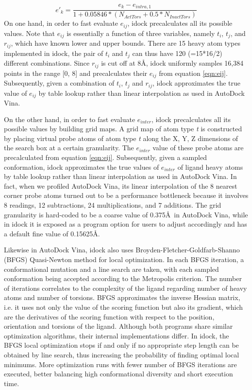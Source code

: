 \begin{equation}
\label{eqn:FlexibilityPenalty}
e'_k = \frac{e_k - e_{intra,1}}{1 + 0.05846 * (N_{ActTors} + 0.5 * N_{InactTors})}
\end{equation}
On one hand, in order to fast evaluate $e_{ij}$, idock precalculates all its possible values. Note that $e_{ij}$ is essentially a function of three variables, namely $t_i$, $t_j$, and $r_{ij}$, which have known lower and upper bounds. There are 15 heavy atom types implemented in idock, the pair of $t_i$ and $t_j$ can thus have 120 (=15*16/2) different combinations. Since $r_{ij}$ is cut off at 8\AA, idock uniformly samples 16,384 points in the range [0, 8] and precalculates their $e_{ij}$ from equation \eqref{eqn:eij}. Subsequently, given a combination of $t_i$, $t_j$ and $r_{ij}$, idock approximates the true value of $e_{ij}$ by table lookup rather than linear interpolation as used in AutoDock Vina.

On the other hand, in order to fast evaluate $e_{inter}$, idock precalculates all its possible values by building grid maps. A grid map of atom type \textit{t} is constructed by placing virtual probe atoms of atom type \textit{t} along the X, Y, Z dimensions of the search box at a certain granularity. The $e_{inter}$ value of these probe atoms are precalculated from equation \eqref{eqn:eij}. Subsequently, given a sampled conformation, idock approximates the true values of $e_{inter}$ of ligand heavy atoms by table lookup rather than linear interpolation as used in AutoDock Vina. In fact, when we profiled AutoDock Vina, its linear interpolation of the 8 nearest corner probe atoms turned out to be a performance bottleneck because it involves 8 readings, 12 subtractions, 24 multiplications, and 7 additions. The grid granularity is hard-coded to be a coarse value of 0.375\AA\ in AutoDock Vina, while in idock it is exposed as a program option for users to adjust accordingly and has a default fine value of 0.15625\AA.

Likewise in AutoDock Vina, idock also uses Broyden-Fletcher-Goldfarb-Shanno (BFGS) \cite{786} Quasi-Newton method for local optimization. In each BFGS iteration, a conformational mutation and a line search are taken, with each sampled conformation being accepted according to the Metropolis criterion. The number of iterations correlates to the complexity of the ligand regarding number of heavy atoms and number of torsions. BFGS approximates the inverse Hessian matrix, i.e. it uses not only the value of the scoring function but also its gradient, which are the derivatives of the scoring function with respect to the position, orientation and torsions of the ligand. Although both programs share similar optimization algorithms, their internal implementations differ. In idock, the BFGS local optimization stops if and only if no appropriate step length can be obtained by line search, thus increasing the probability of finding optimal local minimums. More optimization runs with fewer number of BFGS iterations are executed, better balancing high conformational diversity and short execution time.

